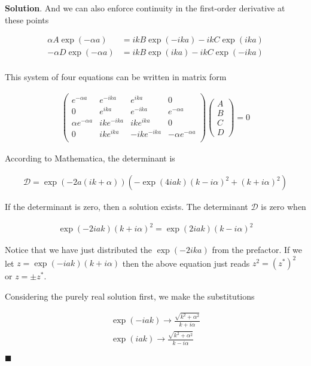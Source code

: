 \documentclass[12pt]{article}
\theoremstyle{definition}
\newenvironment{s}{%
        \begin{trivlist} \item \textbf{Solution}. }{%
            \hspace*{\fill} $\blacksquare$\end{trivlist}}%
\begin{document}
{\begin{s}
And we can also enforce continuity in the first-order derivative at these points

\begin{align*}
\alpha A\exp(-\alpha a) &= ikB\exp(-ika) -ikC\exp(ika)\\
-\alpha D\exp(-\alpha a) &= ikB\exp(ika) -ikC\exp(-ika)\\
\end{align*}

This system of four equations can be written in matrix form

\begin{align*}
\begin{pmatrix}
e^{-\alpha a} & e^{-ika} & e^{ika} & 0\\
0 & e^{ika} & e^{-ika} & e^{-\alpha a}\\
\alpha e^{-\alpha a} & ike^{-ika} & ike^{ika} & 0\\
0 & ike^{ika} & -ike^{-ika} & -\alpha e^{-\alpha a}\\
\end{pmatrix}\begin{pmatrix}A\\B\\C\\D\end{pmatrix} = 0
\end{align*}

According to Mathematica, the determinant is 

\begin{align*}
\mathcal{D} = \exp(-2a(ik+\alpha))\left(-\exp(4iak)(k-i\alpha)^{2} + (k+i\alpha)^{2}\right)
\end{align*}

If the determinant is zero, then a solution exists. The determinant $\mathcal{D}$ is zero when

\begin{align*}
\exp(-2iak)(k+i\alpha)^{2} = \exp(2iak)(k-i\alpha)^{2}
\end{align*}

Notice that we have just distributed the $\exp(-2ika)$ from the prefactor. If we let $z = \exp(-iak)(k+i\alpha)$ then the above equation just reads $z^{2} = (z^{*})^{2}$ or $z = \pm z^{*}$. 

Considering the purely real solution first, we make the substitutions

\begin{align*}
\exp(-iak) \rightarrow \frac{\sqrt{k^{2} + \alpha^{2}}}{k+i\alpha}\\
\exp(iak) \rightarrow \frac{\sqrt{k^{2} + \alpha^{2}}}{k-i\alpha}
\end{align*}



\end{s}}
\end{document}
